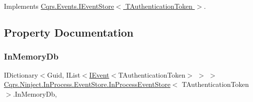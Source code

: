 Implements \hyperlink{interfaceCqrs_1_1Events_1_1IEventStore_a92e768243d6602d09b786bbd06811ce6_a92e768243d6602d09b786bbd06811ce6}{Cqrs.\+Events.\+I\+Event\+Store$<$ T\+Authentication\+Token $>$}.



\subsection{Property Documentation}
\mbox{\label{classCqrs_1_1Ninject_1_1InProcess_1_1EventStore_1_1InProcessEventStore_a189745cc74bcc2f0caac135c87296242_a189745cc74bcc2f0caac135c87296242}} 
\subsubsection{\texorpdfstring{In\+Memory\+Db}{InMemoryDb}}
{\footnotesize\ttfamily I\+Dictionary$<$Guid, I\+List$<$\hyperlink{interfaceCqrs_1_1Events_1_1IEvent}{I\+Event}$<$T\+Authentication\+Token$>$ $>$ $>$ \hyperlink{classCqrs_1_1Ninject_1_1InProcess_1_1EventStore_1_1InProcessEventStore}{Cqrs.\+Ninject.\+In\+Process.\+Event\+Store.\+In\+Process\+Event\+Store}$<$ T\+Authentication\+Token $>$.In\+Memory\+Db\hspace{0.3cm}{\ttfamily [get]}, {\ttfamily [protected]}}

